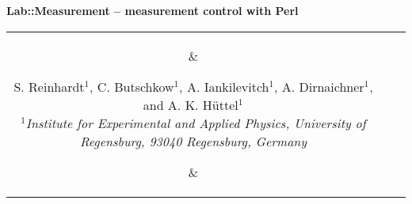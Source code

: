 \documentclass[portrait]{a0poster}
\begin{document}
\color{text}
\Large
%
\newlength{\seplength}
\newlength{\headerheight}
\newlength{\columnheight}
\newlength{\columnheighta}
\newlength{\columnheightb}
%
\setlength{\columnheight}{104cm}           %
\setlength{\columnheighta}{\columnheight-6cm}
\setlength{\columnheightb}{\columnheight+6.5cm}
\setlength{\columnwidth}{0.31\textwidth}   %
%
\setlength{\fboxsep}{10mm}
\setlength{\fboxrule}{0mm}
%
%
%
%
\hspace*{-1cm}\begin{minipage}[t][][t]{\textwidth-2\fboxsep-8\fboxrule}
\color{invheading}
\begin{center}
{
\VERYHuge \vspace*{-0.6cm}
\textsf{\textbf{
Lab::Measurement -- measurement control with Perl
}}
}
\\[\baselineskip]
\begin{tabular}{ccc}
\parbox{5cm}{\vspace*{-1cm}
\begin{center}
\end{center}
}
&
\parbox{70cm}{
\begin{center} 
{
\vspace*{-0.5cm}
\huge 
S. Reinhardt$^1$, C. Butschkow$^1$, A. Iankilevitch$^1$, A. Dirnaichner$^1$, 
and A. K. Hüttel$^1$
}
\\[\medskipamount]
\it 
\Large
$^1$Institute for Experimental and Applied
Physics, University of Regensburg, 93040 Regensburg, Germany\\
\end{center}
\vspace*{0.5cm}
}
&
\parbox{5cm}{\vspace*{-1cm}
\begin{center}
\end{center}
}
\end{tabular}
\end{center}
\end{minipage}
\vspace*{9mm}
\end{document}

